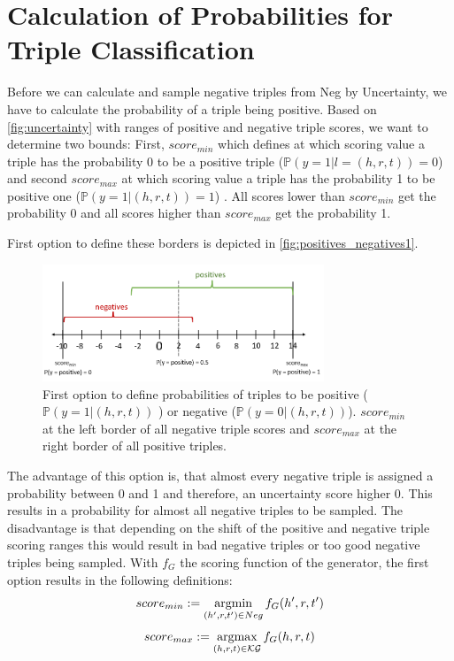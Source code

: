 \section{Calculation of Probabilities for Triple Classification}
\label{sec:calculation_of_probabilitie_for_triple_classification}

Before we can calculate and sample negative triples from Neg by Uncertainty, we have to calculate the probability of a triple being positive.
Based on \autoref{fig:uncertainty} with ranges of positive and negative triple scores, we want to determine two bounds: 
First, $score_{min}$ which defines at which scoring value a triple has the probability 0 to be a positive triple ($\mathds{P}(y = 1 | l = (h,r,t)) = 0$) and second $score_{max}$ at which scoring value a triple has the probability 1 to be positive one ($\mathds{P}(y = 1 | (h,r,t)) = 1$) . 
All scores lower than $score_{min}$ get the probability 0 and all scores higher than $score_{max}$ get the probability 1.

First option to define these borders is depicted in \autoref{fig:positives_negatives1}.
\begin{figure}[t]
  \centering
    \includegraphics[width=0.75\textwidth]{figures/positives_negatives1.PNG}
  \caption{First option to define probabilities of triples to be positive ($\mathds{P}(y = 1 | (h,r,t))$ ) or negative ($\mathds{P}(y = 0 | (h,r,t))$). 
  $score_{min}$ at the left border of all negative triple scores and $score_{max}$ at the right border of all positive triples.}
  \label{fig:positives_negatives1}
\end{figure}
The advantage of this option is, that almost every negative triple is assigned a probability between 0 and 1 and therefore, an uncertainty score higher 0.
This results in a probability for almost all negative triples to be sampled.
The disadvantage is that depending on the shift of the positive and negative triple scoring ranges this would result in bad negative triples or too good negative triples being sampled.
With $f_G$ the scoring function of the generator, the first option results in the following definitions:
\begin{equation} \label{eqn:opt1_score_min}
    score_{min} := \operatorname*{argmin}_{(h',r,t') \in Neg}{f_G(h',r,t')}
\end{equation}
\begin{equation} \label{eqn:opt1_score_max}
    score_{max} := \operatorname*{argmax}_{(h,r,t) \in \mathcal{KG}}{f_G(h,r,t)}
\end{equation}

